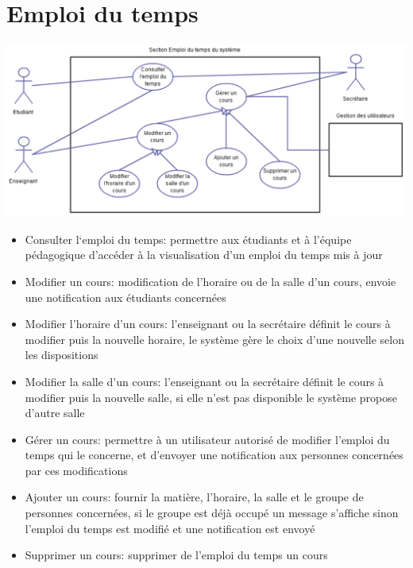 \section{Emploi du temps}
\includegraphics[scale=0.9,angle=90]{cu/EDT.pdf}
\newpage
\begin{itemize}
\item Consulter l‘emploi du temps: permettre aux étudiants et à l’équipe pédagogique d'accéder à la visualisation d’un emploi du temps mis à jour
\item Modifier un cours: modification de l’horaire ou de la salle d’un cours, envoie une notification aux étudiants concernées
\item Modifier l’horaire d’un cours: l’enseignant ou la secrétaire définit le cours à modifier puis la nouvelle horaire, le système gère le choix d’une nouvelle selon les dispositions
\item Modifier la salle d’un cours:  l’enseignant ou la secrétaire définit le cours à modifier puis la nouvelle salle, si elle n’est pas disponible le système propose d’autre salle
\item Gérer un cours: permettre à un utilisateur autorisé de modifier l’emploi du temps qui le concerne, et d’envoyer une notification aux personnes concernées par ces modifications
\item Ajouter un cours: fournir la matière, l’horaire, la salle et le groupe de personnes concernées, si le groupe est déjà occupé un message s’affiche sinon l’emploi du temps est modifié et une notification est envoyé
\item Supprimer un cours: supprimer de l’emploi du temps un cours
\end{itemize}
\newpage


